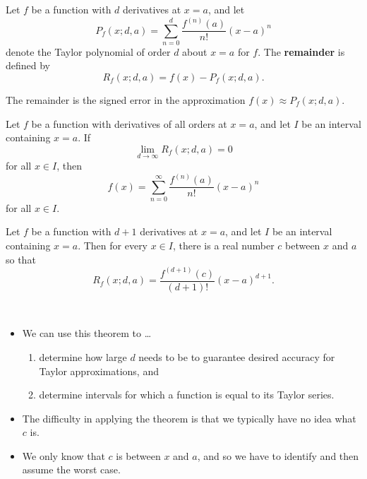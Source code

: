 

\begin{definition}
Let $f$ be a function with $d$ derivatives at $x=a$, and let 
\begin{equation*}
P_f(x; d, a) = \sum_{n=0}^d\frac{f^{(n)}(a)}{n!}(x-a)^n
\end{equation*}
denote the Taylor polynomial of order $d$ about $x=a$ for $f$.
The \textbf{remainder} is defined by
\begin{equation*}
R_f(x;d,a) = f(x) - P_f(x;d,a).
\end{equation*}
\end{definition}

\begin{remark}
The remainder is the signed error in the approximation $f(x)\approx P_f(x;d,a)$.
\end{remark}

\begin{theorem}
Let $f$ be a function with derivatives of all orders at $x=a$, and let $I$ be an interval containing $x=a$.
If
\begin{equation*}
\lim_{d\to\infty}R_f(x; d, a) = 0
\end{equation*}
for all $x\in I$, then
\begin{equation*}
f(x) = \sum_{n=0}^\infty \frac{f^{(n)}(a)}{n!}(x-a)^n
\end{equation*}
for all $x\in I$.
\end{theorem}

\begin{theorem}
Let $f$ be a function with $d+1$ derivatives at $x=a$, and let $I$ be an interval containing $x=a$.
Then for every $x\in I$, there is a real number $c$ between $x$ and $a$ so that
\begin{equation*}
R_f(x;d,a) = \frac{f^{(d+1)}(c)}{(d+1)!}(x-a)^{d+1}.
\end{equation*}
\end{theorem}

\begin{remark}\,
\begin{itemize}
\item We can use this theorem to \dots
\begin{enumerate}
\item determine how large $d$ needs to be to guarantee desired accuracy for Taylor approximations, and
\item determine intervals for which a function is equal to its Taylor series.
\end{enumerate}
\item The difficulty in applying the theorem is that we typically have no idea what $c$ is.
\item We only know that $c$ is between $x$ and $a$, and so we have to identify and then assume the worst case.
\end{itemize}
\end{remark}

